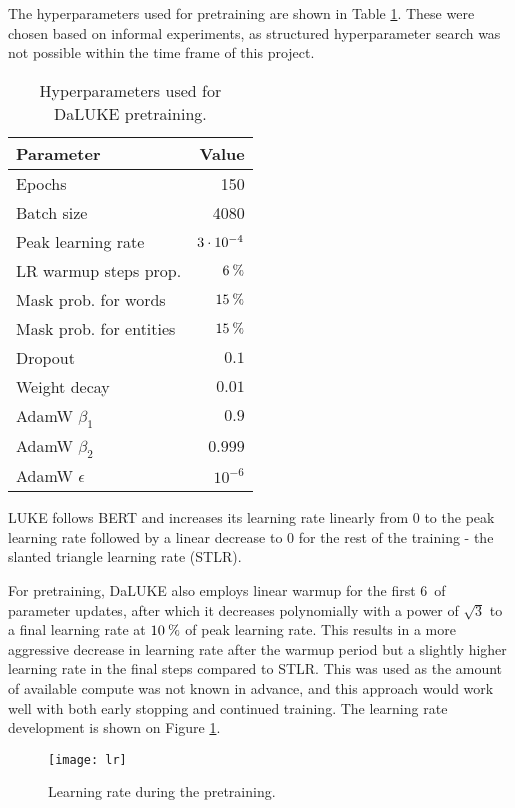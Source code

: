 \documentclass[main.tex]{subfiles}
\begin{document}
The hyperparameters used for pretraining are shown in Table \ref{tab:pretrain-hyper}.
These were chosen based on informal experiments, as structured hyperparameter search was not possible within the time frame of this project.
\begin{table}[H]
    \centering
    \begin{tabular}{l|r}
        Parameter  &    Value\\\hline
        Epochs     & 150\\
        Batch size &    4080\\
        Peak learning rate & $3\cdot10^{-4}$\\
        LR warmup steps prop. & $ 6\:\text{\%{}} $\\
        Mask prob. for words & $ 15\:\text{\%{}} $\\
        Mask prob. for entities & $ 15\:\text{\%{}} $\\
        Dropout & $ 0.1 $\\
        Weight decay & $ 0.01 $\\
        AdamW $ \beta_1 $ & $ 0.9 $\\
        AdamW $ \beta_2 $ & $ 0.999 $\\
        AdamW $ \epsilon $ & $ 10^{-6} $
    \end{tabular}
    \caption{Hyperparameters used for DaLUKE pretraining.}\label{tab:pretrain-hyper}
\end{table}\noindent
LUKE follows BERT and increases its learning rate linearly from 0 to the peak learning rate followed by a linear decrease to 0 for the rest of the training - the slanted triangle learning rate (STLR). \cite{devlin2019bert, yamada2020luke, howardruder2018universal}

For pretraining, DaLUKE also employs linear warmup for the first 6\pro\ of parameter updates, after which it decreases polynomially with a power of $ \sqrt{3} $ to a final learning rate at $10\:\text{\%{}}$ of peak learning rate.
This results in a more aggressive decrease in learning rate after the warmup period but a slightly higher learning rate in the final steps compared to STLR.
This was used as the amount of available compute was not known in advance, and this approach would work well with both early stopping and continued training.
The learning rate development is shown on Figure \ref{fig:lr}.
\begin{figure}
    \centering
    \texttt{[image: lr]}
    \caption{Learning rate during the pretraining.}
    \label{fig:lr}
\end{figure}\noindent
\end{document}
